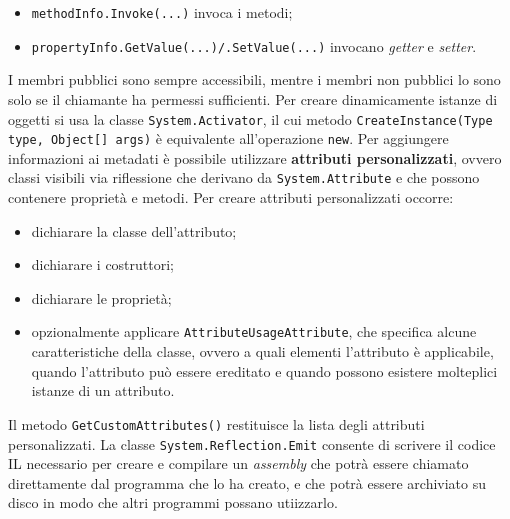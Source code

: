 \begin{solution}
\begin{itemize}
	\item \texttt{methodInfo.Invoke(...)} invoca i metodi;
	\item \texttt{propertyInfo.GetValue(...)/.SetValue(...)} invocano \textit{getter} e \textit{setter}.
\end{itemize}
I membri pubblici sono sempre accessibili, mentre i membri non pubblici lo sono solo se il chiamante ha permessi sufficienti.
Per creare dinamicamente istanze di oggetti si usa la classe \texttt{System.Activator}, il cui metodo \texttt{CreateInstance(Type type, Object[] args)} è equivalente all'operazione \texttt{new}.
\newline\newline
Per aggiungere informazioni ai metadati è possibile utilizzare \textbf{attributi personalizzati}, ovvero classi visibili via riflessione che derivano da \texttt{System.Attribute} e che possono contenere proprietà e metodi.
\newline
Per creare attributi personalizzati occorre:
\begin{itemize}
	\item dichiarare la classe dell'attributo;
	\item dichiarare i costruttori;
	\item dichiarare le proprietà;
	\item opzionalmente applicare \texttt{AttributeUsageAttribute}, che specifica alcune caratteristiche della classe, ovvero a quali elementi l'attributo è applicabile, quando l'attributo può essere ereditato e quando possono esistere molteplici istanze di un attributo.
\end{itemize}
Il metodo \texttt{GetCustomAttributes()} restituisce la lista degli attributi personalizzati.
\newline
La classe \texttt{System.Reflection.Emit} consente di scrivere il codice IL necessario per creare e compilare un \textit{assembly} che potrà essere chiamato direttamente dal programma che lo ha creato, e che potrà essere archiviato su disco in modo che altri programmi possano utiizzarlo.
\end{solution}


